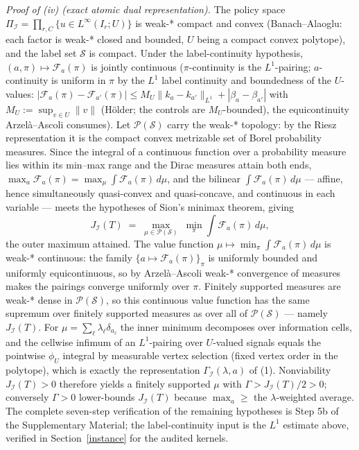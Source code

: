 \documentclass[10pt,twocolumn]{article}
\theoremstyle{plain}
\theoremstyle{definition}
\theoremstyle{remark}
\begin{document}
\emph{Proof of (iv) (exact atomic dual representation).} The policy space
\(\Pi_{\mathcal{I}} = \prod_{r,C}\{u \in L^\infty(I_r; U)\}\) is
weak-* compact and convex (Banach--Alaoglu: each factor is weak-* closed
and bounded, \(U\) being a compact convex polytope), and the label set
\(\mathscr{S}\) is compact. Under the label-continuity hypothesis,
\((a, \pi) \mapsto \mathcal{F}_a(\pi)\) is jointly continuous
(\(\pi\)-continuity is the \(L^1\)-pairing; \(a\)-continuity is
uniform in \(\pi\) by the \(L^1\) label continuity and boundedness of
the \(U\)-values: \(|\mathcal{F}_a(\pi) - \mathcal{F}_{a'}(\pi)| \le
M_U \|k_a - k_{a'}\|_{L^1} + |\beta_a - \beta_{a'}|\) with
\(M_U := \sup_{v \in U} \|v\|\) (H\"older; the controls are
\(M_U\)-bounded), the equicontinuity
Arzel\`a--Ascoli consumes). Let \(\mathcal{P}(\mathscr{S})\) carry the weak-*
topology: by the Riesz representation it is the compact convex metrizable
set of Borel probability measures. Since the integral of a continuous
function over a probability measure lies within its min--max range and
the Dirac measures attain both ends,
\(\max_a \mathcal{F}_a(\pi) = \max_\mu \int
\mathcal{F}_a(\pi)\,d\mu\), and the bilinear
\(\int \mathcal{F}_a(\pi)\,d\mu\) --- affine, hence simultaneously
quasi-convex and quasi-concave, and continuous in each variable --- meets
the hypotheses of Sion's minimax theorem, giving
\[
J_{\mathcal{I}}(T) \;=\; \max_{\mu \in \mathcal{P}(\mathscr{S})}
\; \min_{\pi} \int \mathcal{F}_a(\pi)\,d\mu,
\]
the outer maximum attained. The value function
\(\mu \mapsto \min_\pi \int \mathcal{F}_a(\pi)\,d\mu\) is weak-*
continuous: the family \(\{a \mapsto \mathcal{F}_a(\pi)\}_{\pi}\)
is uniformly bounded and uniformly equicontinuous, so by
Arzel\`a--Ascoli weak-* convergence of measures makes the pairings
converge uniformly over \(\pi\). Finitely supported measures are weak-*
dense in \(\mathcal{P}(\mathscr{S})\), so this continuous value
function has the same supremum over finitely supported measures as over
all of \(\mathcal{P}(\mathscr{S})\) --- namely \(J_{\mathcal{I}}(T)\).
For \(\mu = \sum_\ell \lambda_\ell \delta_{a_\ell}\) the inner
minimum decomposes over information cells, and the cellwise infimum of an
\(L^1\)-pairing over \(U\)-valued signals equals the pointwise
\(\phi_U\) integral by measurable vertex selection (fixed vertex order
in the polytope), which is exactly the representation
\(\Gamma_{\mathcal{I}}(\lambda, a)\) of (1). Nonviability
\(J_{\mathcal{I}}(T) > 0\) therefore yields a finitely supported
\(\mu\) with \(\Gamma > J_{\mathcal{I}}(T)/2 > 0\); conversely
\(\Gamma > 0\) lower-bounds \(J_{\mathcal{I}}(T)\) because
\(\max_a \ge \) the \(\lambda\)-weighted average. The complete
seven-step verification of the remaining hypotheses is Step 5b of the
Supplementary Material; the label-continuity input is the \(L^1\)
estimate above, verified in Section~\ref{instance} for the audited
kernels.
\end{document}
